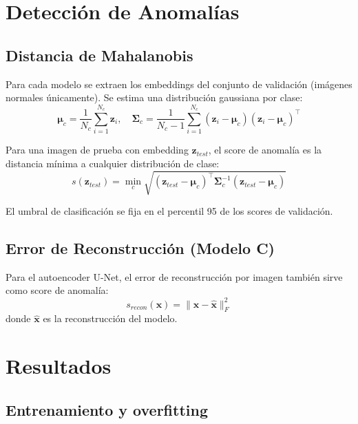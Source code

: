 \documentclass[conference]{IEEEtran}
\begin{document}
\section{Detección de Anomalías}

\subsection{Distancia de Mahalanobis}

Para cada modelo se extraen los embeddings del conjunto de validación (imágenes
normales únicamente). Se estima una distribución gaussiana por clase:
\begin{equation}
  \boldsymbol{\mu}_c = \frac{1}{N_c}\sum_{i=1}^{N_c} \mathbf{z}_i, \quad
  \boldsymbol{\Sigma}_c = \frac{1}{N_c-1}\sum_{i=1}^{N_c}(\mathbf{z}_i - \boldsymbol{\mu}_c)(\mathbf{z}_i - \boldsymbol{\mu}_c)^\top
\end{equation}

Para una imagen de prueba con embedding $\mathbf{z}_{test}$, el score de anomalía
es la distancia mínima a cualquier distribución de clase:
\begin{equation}
  s(\mathbf{z}_{test}) = \min_c \sqrt{(\mathbf{z}_{test} - \boldsymbol{\mu}_c)^\top
  \boldsymbol{\Sigma}_c^{-1} (\mathbf{z}_{test} - \boldsymbol{\mu}_c)}
\end{equation}

El umbral de clasificación se fija en el percentil 95 de los scores de validación.

\subsection{Error de Reconstrucción (Modelo C)}

Para el autoencoder U-Net, el error de reconstrucción por imagen también sirve
como score de anomalía:
\begin{equation}
  s_{recon}(\mathbf{x}) = \|\mathbf{x} - \hat{\mathbf{x}}\|_F^2
\end{equation}
donde $\hat{\mathbf{x}}$ es la reconstrucción del modelo.

\section{Resultados}

\subsection{Entrenamiento y overfitting}
\end{document}
